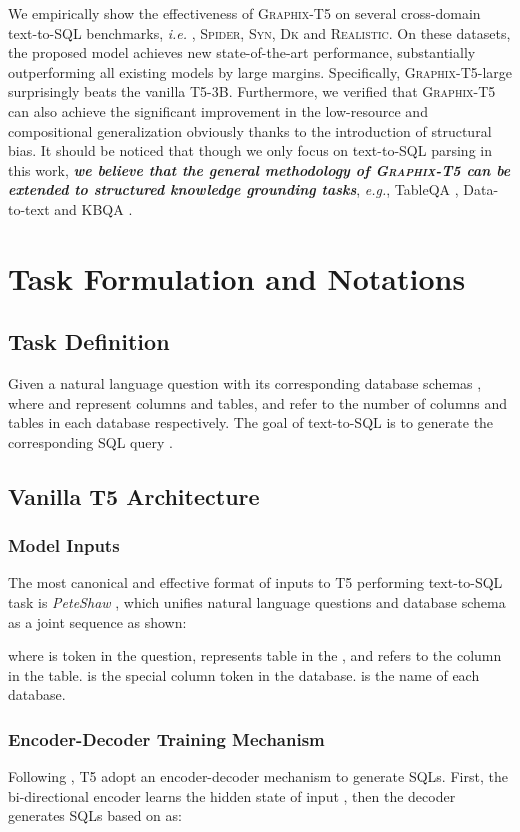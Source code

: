 \documentclass[letterpaper]{article} \usepackage{aaai23}  \usepackage{times}  \usepackage{helvet}  \usepackage{courier}  \usepackage[hyphens]{url}  \usepackage{graphicx} \usepackage{amsmath}
\newcommand{\graphix}{\textsc{Graphix}\xspace}
\newcommand{\spider}{\textsc{Spider}\xspace}
\newcommand{\syn}{\textsc{Syn}\xspace}
\newcommand{\real}{\textsc{Realistic}\xspace}
\newcommand{\dk}{\textsc{Dk}\xspace}
\def\eg{\emph{e.g.}}
\def\ie{\emph{i.e. }}
\begin{document}
We empirically show the effectiveness of \graphix-T5 on several cross-domain text-to-SQL benchmarks, \ie, \spider, \syn, \dk and \real.
On these datasets, the proposed model achieves new state-of-the-art performance, substantially outperforming all existing models by large margins. Specifically, \graphix-T5-large surprisingly beats the vanilla T5-3B.
Furthermore, we verified that \graphix-T5 can also achieve the significant improvement in the low-resource and compositional generalization obviously thanks to the introduction of structural bias.
It should be noticed that though we only focus on text-to-SQL parsing in this work, \textbf{\textit{we believe that the general methodology of \graphix-T5 can be extended to structured knowledge grounding tasks}}, \eg, TableQA \citep{wikiTQ}, Data-to-text \citep{nan-etal-2021-dart} and KBQA \citep{kgqa}.



\section{Task Formulation and Notations}
\subsection{Task Definition}
Given a natural language question  with its corresponding database schemas , where  and  represent columns and tables,  and  refer to the number of columns and tables in each database respectively.
The goal of text-to-SQL is to generate the corresponding SQL query .

\subsection{Vanilla T5 Architecture}
\subsubsection{Model Inputs}
The most canonical and effective format of inputs to T5 performing text-to-SQL task is \textit{PeteShaw} \citep{shaw-etal-2021-compositional}, which unifies natural language questions  and database schema  as a joint sequence as shown:

where  is  token in the question,  represents  table in the , and  refers to the  column in the  table.  is the special column token in the database.
 is the name of each database.


\subsubsection{Encoder-Decoder Training Mechanism}
Following \citep{shaw-etal-2021-compositional}, T5 \citep{t5-jmir-2020} adopt an encoder-decoder mechanism to generate SQLs. 
First, the bi-directional encoder learns the hidden state  of input , then the decoder generates SQLs based on  as:
\end{document}
